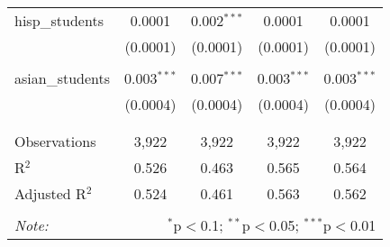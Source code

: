 \begin{table}[!htbp]
\begin{tabular}{@{\extracolsep{-2pt}}lcccc}
 hisp\_students & 0.0001 & 0.002$^{***}$ & 0.0001 & 0.0001 \\ 
  & (0.0001) & (0.0001) & (0.0001) & (0.0001) \\ 
  & & & & \\ 
 asian\_students & 0.003$^{***}$ & 0.007$^{***}$ & 0.003$^{***}$ & 0.003$^{***}$ \\ 
  & (0.0004) & (0.0004) & (0.0004) & (0.0004) \\ 
  & & & & \\ 
\hline \\[-1.8ex] 
Observations & 3,922 & 3,922 & 3,922 & 3,922 \\ 
R$^{2}$ & 0.526 & 0.463 & 0.565 & 0.564 \\ 
Adjusted R$^{2}$ & 0.524 & 0.461 & 0.563 & 0.562 \\ 
\hline 
\hline \\[-1.8ex] 
\textit{Note:}  & \multicolumn{4}{r}{$^{*}$p$<$0.1; $^{**}$p$<$0.05; $^{***}$p$<$0.01} \\ 
\end{tabular} 
\end{table} 
